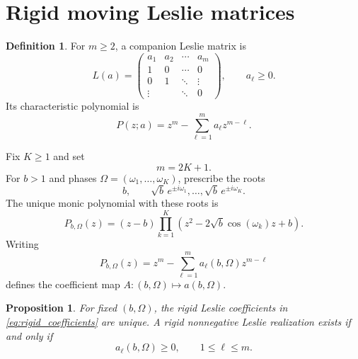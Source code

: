 \documentclass[11pt]{amsart}
\numberwithin{equation}{section}
\theoremstyle{plain}
\newtheorem{proposition}[theorem]{Proposition}
\theoremstyle{definition}
\newtheorem{definition}[theorem]{Definition}
\theoremstyle{remark}
\begin{document}
\section{Rigid moving Leslie matrices}
\label{sec:rigid_moving_leslie}

\begin{definition}
\label{def:leslie_matrix}
For $m\geq2$, a companion Leslie matrix is
\begin{equation}
L(a)=
\begin{pmatrix}
a_1&a_2&\cdots&a_m\\
1&0&\cdots&0\\
0&1&\ddots&\vdots\\
\vdots&&\ddots&0
\end{pmatrix},
\qquad a_\ell\geq0.
\label{eq:leslie_matrix}
\end{equation}
Its characteristic polynomial is
\begin{equation}
P(z;a)=z^m-\sum_{\ell=1}^{m}a_\ell z^{m-\ell}.
\label{eq:characteristic_polynomial}
\end{equation}
\end{definition}

Fix $K\geq1$ and set
\begin{equation}
m=2K+1.
\label{eq:rigid_dimension}
\end{equation}
For $b>1$ and phases $\Omega=(\omega_1,\ldots,\omega_K)$, prescribe the roots
\begin{equation}
b,
\qquad
\sqrt b\,e^{\pm i\omega_1},\ldots,
\sqrt b\,e^{\pm i\omega_K}.
\label{eq:prescribed_roots}
\end{equation}
The unique monic polynomial with these roots is
\begin{equation}
P_{b,\Omega}(z)
=(z-b)\prod_{k=1}^{K}
\left(z^2-2\sqrt b\cos(\omega_k)z+b\right).
\label{eq:rigid_polynomial}
\end{equation}
Writing
\begin{equation}
P_{b,\Omega}(z)
=z^m-\sum_{\ell=1}^{m}a_\ell(b,\Omega)z^{m-\ell}
\label{eq:rigid_coefficients}
\end{equation}
defines the coefficient map $A:(b,\Omega)\mapsto a(b,\Omega)$.

\begin{proposition}
\label{prop:uniqueness}
For fixed $(b,\Omega)$, the rigid Leslie coefficients in \eqref{eq:rigid_coefficients} are unique.  A rigid nonnegative Leslie realization exists if and only if
\begin{equation}
a_\ell(b,\Omega)\geq0,
\qquad 1\leq\ell\leq m.
\label{eq:coefficient_nonnegativity}
\end{equation}
\end{proposition}
\end{document}
